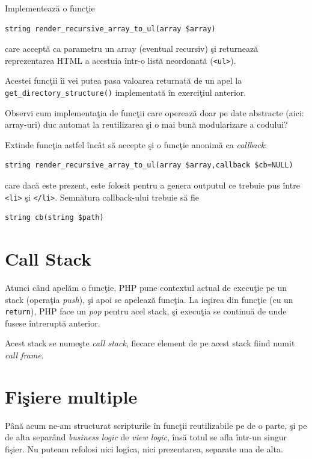 \begin{Exercise}[title={Afişarea unei structuri de date recursive},difficulty=1]
\ExePart

Implementează o funcţie
\begin{verbatim}
string render_recursive_array_to_ul(array $array)
\end{verbatim}
care acceptă ca parametru un array (eventual recursiv) şi returnează
reprezentarea HTML a acestuia într-o listă neordonată (\texttt{<ul>}).

Acestei funcţii îi vei putea pasa valoarea returnată
de un apel la \texttt{get\_directory\_structure()} implementată
în exerciţiul anterior.

Observi cum implementaţia de funcţii care operează
doar pe date abstracte (aici: array-uri) duc
automat la reutilizarea şi o mai bună
modularizare a codului?

\ExePart

Extinde funcţia astfel încât să accepte şi o funcţie anonimă
ca \textit{callback}:
\begin{verbatim}
string render_recursive_array_to_ul(array $array,callback $cb=NULL)
\end{verbatim}
care dacă este prezent, este folosit pentru a genera outputul
ce trebuie pus între \texttt{<li>} şi \texttt{</li>}.
Semnătura callback-ului trebuie să fie
\begin{verbatim}
string cb(string $path)
\end{verbatim}
\end{Exercise}

\section{Call Stack}
Atunci când apelăm o funcţie, PHP pune contextul actual de execuţie
pe un stack (operaţia \textit{push}), şi apoi se apelează funcţia.
La ieşirea din funcţie (cu un \texttt{return}), PHP face un
\textit{pop} pentru acel stack, şi execuţia se continuă de unde
fusese întreruptă anterior.

Acest stack se numeşte \textsl{call stack}, fiecare element
de pe acest stack fiind numit \textsl{call frame}.
\section{Fişiere multiple}
Până acum ne-am structurat scripturile în funcţii reutilizabile pe de o parte,
şi pe de alta separând \textit{business logic} de \textit{view logic}, însă
totul se afla într-un singur fişier. Nu puteam refolosi nici logica, nici
prezentarea, separate una de alta.

